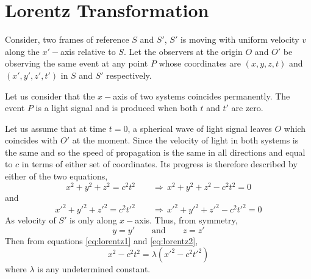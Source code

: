 \documentclass[../main-sheet.tex]{subfiles}
\begin{document}
\section{Lorentz Transformation}
Consider, two frames of reference \(S \) and \(S'\), \(S'\) is moving with uniform velocity \(v \) along the \(x'-\)axis relative to \(S\). Let the observers at the origin \(O \) and \(O'\) be observing the same event at any point \(P \) whose coordinates are \((x,y,z,t )\) and \((x',y',z',t')\) in \(S \) and \(S' \) respectively.

Let us consider that the \(x-\)axis of two systems coincides permanently. The event \(P \) is a light signal and is produced when both \(t \) and \(t'\) are zero.

Let us assume that at time \(t=0\), a spherical wave of light signal leaves \(O \) which coincides with \(O'\) at the moment. Since the velocity of light in both systems is the same and so the speed of propagation is the same in all directions and equal to \(c \) in terms of either set of coordinates. Its progress is therefore described by either of the two equations,
\begin{equation}
    x^2+y^2+z^2=c^2t^2\qquad\Rightarrow\,x^2+y^2+z^2-c^2t^2=0\label{eq:lorentz1} 
\end{equation}
and
\begin{equation}
    x'^2+y'^2+z'^2=c^2t'^2\qquad\Rightarrow\,x'^2+y'^2+z'^2-c^2t'^2=0\label{eq:lorentz2} 
\end{equation}
As velocity of \(S' \) is only along \(x-\)axis. Thus, from symmetry,
\begin{equation}
    y=y'\qquad \text{and}\qquad z=z' \label{eq:lorentz3}
\end{equation}
Then from equations \eqref{eq:lorentz1} and \eqref{eq:lorentz2},
\begin{equation}
    x^2-c^2t^2=\lambda(x'^2-c^2t'^2)\label{eq:lorentz4}
\end{equation}
where \(\lambda\) is any undetermined constant.
\end{document}
